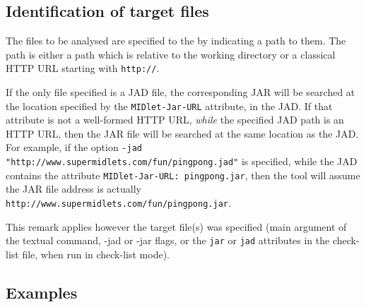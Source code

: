 \subsection{Identification of target files}\label{IdentTargetFiles}
The files to be analysed are specified to the \ma by indicating a
path to them. The path is either a path which is relative to the
working directory or a classical HTTP URL starting with \texttt{http://}.

If the only file specified is a JAD file, the corresponding JAR
will be searched at the location specified by the 
\texttt{MIDlet-Jar-URL} attribute, in the JAD. If that attribute is
not a well-formed HTTP URL, \emph{while} the specified JAD path is
an HTTP URL, then the JAR file will be searched at the same location
as the JAD. For example, if the option
\texttt{-jad "http://www.supermidlets.com/fun/pingpong.jad"} is
specified, while the JAD contains the attribute
\texttt{MIDlet-Jar-URL: pingpong.jar}, then the tool will assume the JAR
file address is actually
\texttt{http://www.supermidlets.com/fun/pingpong.jar}.

This remark applies however the target file(s) was specified (main argument of the textual command, -jad or -jar flags, or
the \texttt{jar} or \texttt{jad} attributes in the check-list file, when
run in check-list mode).

\subsection{Examples}

